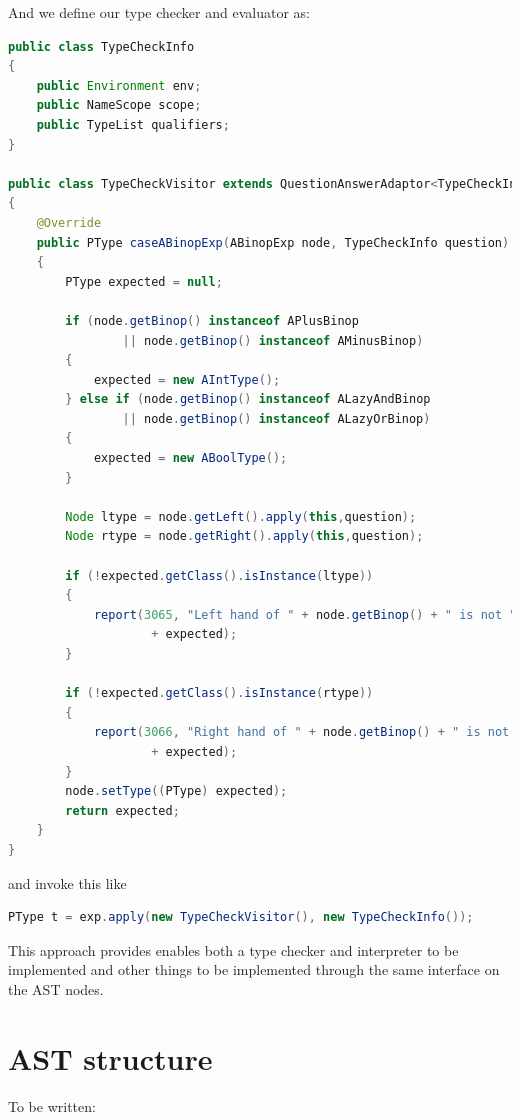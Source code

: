 \documentclass{overturerep}
\begin{document}
And we define our type checker and evaluator as:
\begin{lstlisting}[language=java]
public class TypeCheckInfo
{
	public Environment env;
	public NameScope scope;
	public TypeList qualifiers;
}

public class TypeCheckVisitor extends QuestionAnswerAdaptor<TypeCheckInfo, PType>
{
	@Override
	public PType caseABinopExp(ABinopExp node, TypeCheckInfo question)
	{
		PType expected = null;

		if (node.getBinop() instanceof APlusBinop
				|| node.getBinop() instanceof AMinusBinop)
		{
			expected = new AIntType();
		} else if (node.getBinop() instanceof ALazyAndBinop
				|| node.getBinop() instanceof ALazyOrBinop)
		{
			expected = new ABoolType();
		}

		Node ltype = node.getLeft().apply(this,question);
		Node rtype = node.getRight().apply(this,question);

		if (!expected.getClass().isInstance(ltype))
		{
			report(3065, "Left hand of " + node.getBinop() + " is not "
					+ expected);
		}

		if (!expected.getClass().isInstance(rtype))
		{
			report(3066, "Right hand of " + node.getBinop() + " is not "
					+ expected);
		}
		node.setType((PType) expected);
		return expected;
	}
}
\end{lstlisting}

and invoke this like

\begin{lstlisting}[language=java]
PType t = exp.apply(new TypeCheckVisitor(), new TypeCheckInfo());
\end{lstlisting}

This approach provides enables both a type checker and interpreter to be implemented and other things to be implemented through the same interface on the AST nodes.


\section{AST structure}
To be written:
\end{document}
